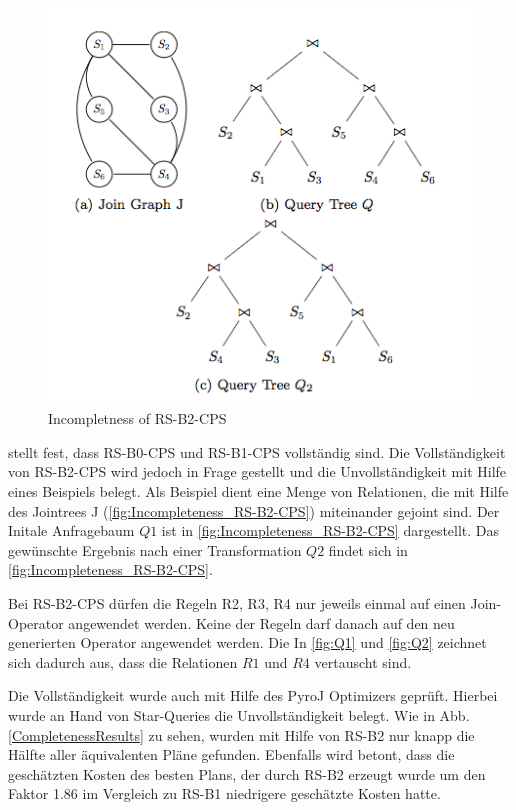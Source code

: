 \begin{figure}[h]
  \centering
  \includegraphics[width=\textwidth]{03_Related_Work/Incompleteness_RS-B2-CPS.png}
  \caption{Incompletness of RS-B2-CPS}
  \label{Incompleteness_RS-B2-CPS}
\end{figure}


\cite{shanbhag2014optimizing} stellt fest, dass RS-B0-CPS und RS-B1-CPS vollständig sind. Die Vollständigkeit von RS-B2-CPS wird jedoch in Frage gestellt und die Unvollständigkeit mit Hilfe eines Beispiels belegt. Als Beispiel dient eine Menge von Relationen, die mit Hilfe des Jointrees J (\ref{fig:Incompleteness_RS-B2-CPS}) miteinander gejoint sind. Der Initale Anfragebaum $Q1$ ist in \ref{fig:Incompleteness_RS-B2-CPS} dargestellt. Das gewünschte Ergebnis nach einer Transformation $Q2$  findet sich in \ref{fig:Incompleteness_RS-B2-CPS}. 

Bei RS-B2-CPS dürfen die Regeln R2, R3, R4 nur jeweils einmal auf einen Join-Operator angewendet werden. Keine der Regeln darf danach auf den neu generierten Operator angewendet werden. Die In \ref{fig:Q1} und \ref{fig:Q2} zeichnet sich dadurch aus, dass die Relationen $R1$ und $R4$ vertauscht sind.


Die Vollständigkeit wurde auch mit Hilfe des PyroJ Optimizers geprüft. Hierbei wurde an Hand von Star-Queries  die Unvollständigkeit belegt. Wie in Abb. \ref{CompletenessResults} zu sehen, wurden mit Hilfe von RS-B2 nur knapp die Hälfte aller äquivalenten Pläne gefunden. Ebenfalls wird betont, dass die geschätzten Kosten des besten Plans, der durch RS-B2 erzeugt wurde um den Faktor 1.86 im Vergleich zu RS-B1 niedrigere geschätzte Kosten hatte.







